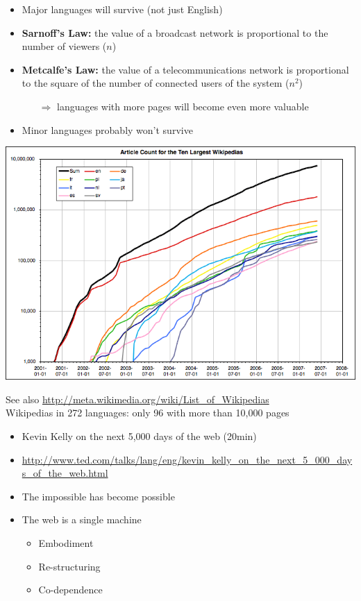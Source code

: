 \documentclass[a4paper,landscape,headrule,footrule,xetex]{foils}
\begin{document}
\MyLogo{}
\begin{itemize}
\item Major languages will survive (not just English)
\item \textbf{Sarnoff's Law:} the value of a broadcast network is
  proportional to the number of viewers ($n$)
\item \textbf{Metcalfe's Law:} the value of a telecommunications
    network is proportional to the square of the number of connected
    users of the system ($n^2$)
    \begin{itemize}
    \item[$\Rightarrow$] languages with more pages will become even more valuable
    \end{itemize}
\item Minor languages probably won't survive
\end{itemize}




\begin{center}
  \includegraphics[height=0.8\textheight]{../pics/TopTenWikipediasGraph}
\end{center}
 See also \url{http://meta.wikimedia.org/wiki/List_of_Wikipedias}
\\ Wikipedias in 272 languages: only 96 with more than 10,000 pages

\MyLogo{}
\begin{itemize}
\item Kevin Kelly on the next 5,000 days of the web (20min)
\item \url{http://www.ted.com/talks/lang/eng/kevin_kelly_on_the_next_5_000_days_of_the_web.html}
\item The impossible has become possible
\item The web is a single machine
  \begin{itemize}
  \item Embodiment
  \item Re-structuring
  \item Co-dependence
  \end{itemize}

\end{itemize}
\end{document}
